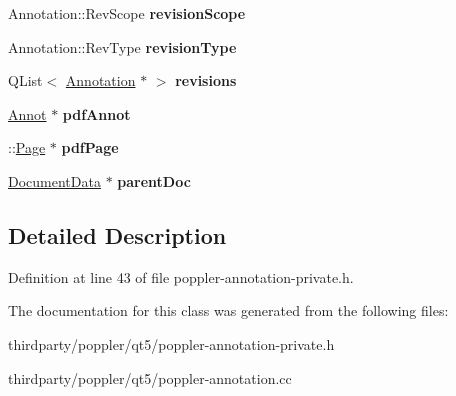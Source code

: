 \begin{DoxyCompactItemize}
\item 
\mbox{\label{class_poppler_1_1_annotation_private_ae3c4d20cdff565805c3f03cc64373cb6}} 
Annotation\+::\+Rev\+Scope {\bfseries revision\+Scope}
\item 
\mbox{\label{class_poppler_1_1_annotation_private_ad144e17cb002c46efdb20b2893f2f115}} 
Annotation\+::\+Rev\+Type {\bfseries revision\+Type}
\item 
\mbox{\label{class_poppler_1_1_annotation_private_aec4c29c57de417cbfb53fedb8f535ca0}} 
Q\+List$<$ \hyperlink{class_poppler_1_1_annotation}{Annotation} $\ast$ $>$ {\bfseries revisions}
\item 
\mbox{\label{class_poppler_1_1_annotation_private_a2082f5236f6ba21ed5cc2dddd552e9fd}} 
\hyperlink{class_annot}{Annot} $\ast$ {\bfseries pdf\+Annot}
\item 
\mbox{\label{class_poppler_1_1_annotation_private_a8cafb77acbb16015b7912cf0e3c7105a}} 
\+::\hyperlink{class_poppler_1_1_page}{Page} $\ast$ {\bfseries pdf\+Page}
\item 
\mbox{\label{class_poppler_1_1_annotation_private_a9da8f411563890c9850e32f27db0a5fb}} 
\hyperlink{class_poppler_1_1_document_data}{Document\+Data} $\ast$ {\bfseries parent\+Doc}
\end{DoxyCompactItemize}


\subsection{Detailed Description}


Definition at line 43 of file poppler-\/annotation-\/private.\+h.



The documentation for this class was generated from the following files\+:\begin{DoxyCompactItemize}
\item 
thirdparty/poppler/qt5/poppler-\/annotation-\/private.\+h\item 
thirdparty/poppler/qt5/poppler-\/annotation.\+cc\end{DoxyCompactItemize}

